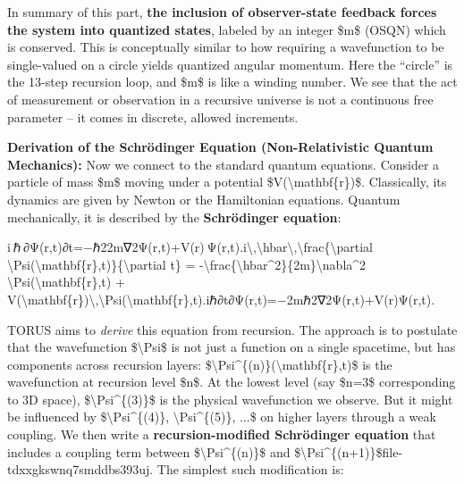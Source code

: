 \documentclass[
]{article}
\begin{document}
In summary of this part, \textbf{the inclusion of observer-state
feedback forces the system into quantized states}, labeled by an integer
\$m\$ (OSQN) which is conserved. This is conceptually similar to how
requiring a wavefunction to be single-valued on a circle yields
quantized angular momentum. Here the ``circle'' is the 13-step recursion
loop, and \$m\$ is like a winding number\hspace{0pt}. We see that the
act of measurement or observation in a recursive universe is not a
continuous free parameter -- it comes in discrete, allowed increments.

\textbf{Derivation of the Schrödinger Equation (Non-Relativistic Quantum
Mechanics):} Now we connect to the standard quantum equations. Consider
a particle of mass \$m\$ moving under a potential
\$V(\textbackslash mathbf\{r\})\$. Classically, its dynamics are given
by Newton or the Hamiltonian equations. Quantum mechanically, it is
described by the \textbf{Schrödinger equation}:

i ℏ ∂Ψ(r,t)∂t=−ℏ22m∇2Ψ(r,t)+V(r) Ψ(r,t).i\textbackslash,\textbackslash hbar\textbackslash,\textbackslash frac\{\textbackslash partial
\textbackslash Psi(\textbackslash mathbf\{r\},t)\}\{\textbackslash partial
t\} =
-\textbackslash frac\{\textbackslash hbar\^{}2\}\{2m\}\textbackslash nabla\^{}2
\textbackslash Psi(\textbackslash mathbf\{r\},t) +
V(\textbackslash mathbf\{r\})\textbackslash,\textbackslash Psi(\textbackslash mathbf\{r\},t).iℏ∂t∂Ψ(r,t)\hspace{0pt}=−2mℏ2\hspace{0pt}∇2Ψ(r,t)+V(r)Ψ(r,t).

TORUS aims to \emph{derive} this equation from recursion. The approach
is to postulate that the wavefunction \$\textbackslash Psi\$ is not just
a function on a single spacetime, but has components across recursion
layers: \$\textbackslash Psi\^{}\{(n)\}(\textbackslash mathbf\{r\},t)\$
is the wavefunction at recursion level \$n\$. At the lowest level (say
\$n=3\$ corresponding to 3D space), \$\textbackslash Psi\^{}\{(3)\}\$ is
the physical wavefunction we observe. But it might be influenced by
\$\textbackslash Psi\^{}\{(4)\}, \textbackslash Psi\^{}\{(5)\}, ...\$ on
higher layers through a weak coupling. We then write a
\textbf{recursion-modified Schrödinger equation} that includes a
coupling term between \$\textbackslash Psi\^{}\{(n)\}\$ and
\$\textbackslash Psi\^{}\{(n+1)\}\$\hspace{0pt}file-tdxxgkswnq7smddbs393uj.
The simplest such modification is:
\end{document}

